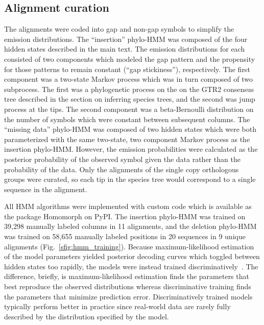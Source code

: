 \documentclass[10pt,letterpaper]{article}
\begin{document}
\subsection*{Alignment curation}
The alignments were coded into gap and non-gap symbols to simplify the emission distributions. The ``insertion'' phylo-HMM was composed of the four hidden states described in the main text. The emission distributions for each consisted of two components which modeled the gap pattern and the propensity for those patterns to remain constant (``gap stickiness''), respectively. The first component was a two-state Markov process which was in turn composed of two subprocess. The first was a phylogenetic process on the on the GTR2 consensus tree described in the section on inferring species trees, and the second was jump process at the tips. The second component was a beta-Bernoulli distribution on the number of symbols which were constant between subsequent columns. The ``missing data'' phylo-HMM was composed of two hidden states which were both parameterized with the same two-state, two component Markov process as the insertion phylo-HMM. However, the emission probabilities were calculated as the posterior probability of the observed symbol given the data rather than the probability of the data. Only the alignments of the single copy orthologous groups were curated, so each tip in the species tree would correspond to a single sequence in the alignment.

All HMM algorithms were implemented with custom code which is available as the package Homomorph on PyPI. The insertion phylo-HMM was trained on 39,298 manually labeled columns in 11 alignments, and the deletion phylo-HMM was trained on 58,655 manually labeled positions in 20 sequences in 9 unique alignments (Fig.~\ref{sfig:hmm_training}). Because maximum-likelihood estimation of the model parameters yielded posterior decoding curves which toggled between hidden states too rapidly, the models were instead trained discriminatively~\cite{Krogh1999}. The difference, briefly, is maximum-likelihood estimation finds the parameters that best reproduce the observed distributions whereas discriminative training finds the parameters that minimize prediction error. Discriminatively trained models typically perform better in practice since real-world data are rarely fully described by the distribution specified by the model.
\end{document}
